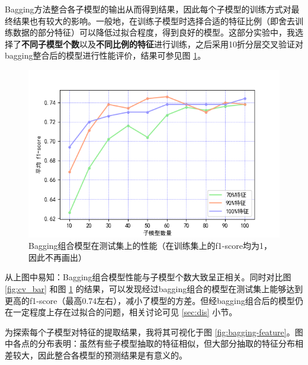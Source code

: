 \documentclass[12pt,a4paper]{article}
\theoremstyle{definition}
\begin{document}
Bagging方法整合各子模型的输出从而得到结果，因此每个子模型的训练方式对最终结果也有较大的影响。一般地，在训练子模型时选择合适的特征比例（即舍去训练数据的部分特征）可以降低过拟合程度，得到良好的模型。这部分实验中，我选择了\textbf{不同子模型个数}以及\textbf{不同比例的特征}进行训练，之后采用10折分层交叉验证对bagging整合后的模型进行性能评价，结果可参见图 \ref{fig:bagging}。

\vspace{-0.015\linewidth}
\begin{figure}[H]
	\centering
	\includegraphics[width=0.8\linewidth]{img/bagging_kline.png}
	\caption{Bagging组合模型在测试集上的性能（在训练集上的f1-score均为1，因此不再画出）}
	\label{fig:bagging}
\end{figure}

从上图中易知：Bagging组合模型性能与子模型个数大致呈正相关。同时对比图 \ref{fig:cv_bar} 和图 \ref{fig:bagging} 的结果，可以发现经过bagging组合的模型在测试集上能够达到更高的f1-score（最高0.74左右），减小了模型的方差。但经bagging组合后的模型仍在一定程度上存在过拟合的问题，相关讨论可见 \ref{sec:dis} 小节。

\vspace{0.015\linewidth}
为探索每个子模型对特征的提取结果，我将其可视化于图 \ref{fig:bagging-feature}。图中各点的分布表明：虽然有些子模型抽取的特征相似，但大部分抽取的特征分布相差较大，因此整合各模型的预测结果是有意义的。
\end{document}
